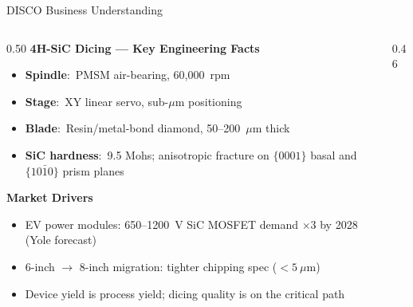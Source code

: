 \documentclass[aspectratio=169,11pt]{beamer}
\newcommand{\kv}[2]{\textbf{#1}:~#2}
\begin{document}
\begin{frame}[shrink=10]{DISCO Business Understanding}
  \begin{columns}[T]
    \begin{column}{0.50\textwidth}
      \textbf{4H-SiC Dicing --- Key Engineering Facts}
      \vspace{0.4em}
      \begin{itemize}
        \item \kv{Spindle}{PMSM air-bearing, 60{,}000~rpm}
        \item \kv{Stage}{XY linear servo, sub-$\mu$m positioning}
        \item \kv{Blade}{Resin/metal-bond diamond, 50--200~$\mu$m thick}
        \item \kv{SiC hardness}{9.5 Mohs; anisotropic fracture on
              $\{0001\}$ basal and $\{10\bar{1}0\}$ prism planes}
      \end{itemize}

      \vspace{0.6em}
      \textbf{Market Drivers \cite{johnson2021sic}}
      \begin{itemize}
        \item EV power modules: 650--1200~V SiC MOSFET demand
              $\times3$ by 2028 (Yole forecast)
        \item 6-inch $\to$ 8-inch migration: tighter chipping spec
              ($< 5~\mu$m)
        \item Device yield is process yield; dicing quality is on
              the critical path
      \end{itemize}
    \end{column}
    \begin{column}{0.46\textwidth}
      \centering


\end{column}
\end{columns}
\end{frame}
\end{document}
